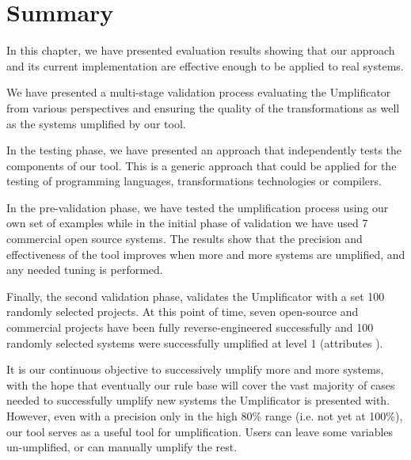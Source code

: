 \section{Summary}

In this chapter, we have presented evaluation results showing that our approach and its current implementation are effective enough to be applied to real systems.

We have presented a multi-stage validation process evaluating the Umplificator from various perspectives
and ensuring the quality of the transformations as well as the systems umplified by our tool.

In the testing phase, we have presented an approach that independently tests the components of our tool. This is a generic approach that could be applied for the testing of programming languages, transformations technologies or compilers.

In the pre-validation phase, we have tested the umplification process using our own set of examples while in the initial phase of validation we have used 7 commercial open source systems. The results show that the precision and effectiveness of the tool improves when more and more systems are umplified, and any needed tuning is performed.

Finally, the second validation phase, validates the Umplificator with a set 100 randomly selected projects. At this point of time, seven open-source and commercial projects have been fully reverse-engineered successfully and 100 randomly selected systems were successfully umplified at level 1 (attributes ). 


It is our continuous objective to successively umplify more and more systems, with the hope that eventually our rule base will cover the vast majority of cases needed to successfully umplify new systems the Umplificator is presented with. However, even with a precision only in the high 80\% range (i.e. not yet at 100\%), our tool serves as a useful tool for umplification. Users can leave some variables un-umplified, or can manually umplify the rest.  

